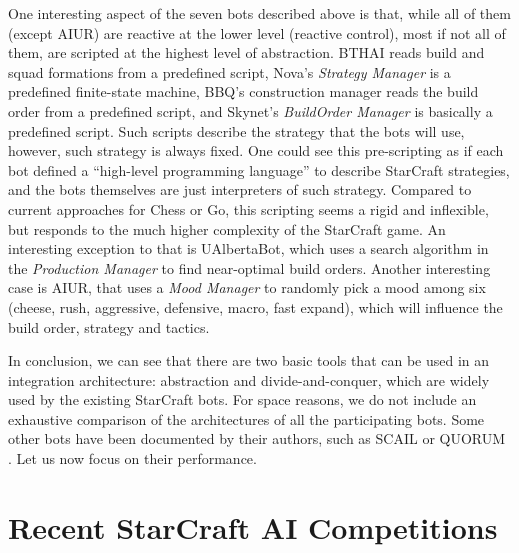\documentclass[journal]{IEEEtran}
\begin{document}
One  interesting aspect  of the  seven bots  described above  is that,
while all  of them (except AIUR) are  reactive at the  lower level
(reactive  control), most  if not  all of  them, are  scripted  at the
highest level  of abstraction. BTHAI reads build  and squad formations
from  a  predefined  script,   Nova's  {\em  Strategy  Manager}  is  a
predefined finite-state machine,  BBQ's construction manager reads the
build  order from a  predefined script,  and Skynet's  {\em BuildOrder
  Manager} is basically a predefined script. Such scripts describe the
strategy  that the  bots will  use, however,  such strategy  is always
fixed.   One could see  this pre-scripting  as if  each bot  defined a
``high-level programming language''  to describe StarCraft strategies,
and   the   bots   themselves    are   just   interpreters   of   such
strategy.  Compared  to  current  approaches  for Chess  or  Go,  this
scripting  seems a  rigid and  inflexible,  but responds  to the  much
higher complexity of the  StarCraft game.  An interesting exception to
that  is  UAlbertaBot, which  uses  a  search  algorithm in  the  {\em
  Production  Manager}  to find  near-optimal  build orders.   Another
interesting case is  AIUR, that uses a {\em  Mood Manager} to randomly
pick  a mood among  six (cheese,  rush, aggressive,  defensive, macro,
fast  expand), which  will  influence the  build  order, strategy  and
tactics. %

In conclusion, we can see that there are two basic tools that can be used in an integration architecture: abstraction and divide-and-conquer, which are widely used by the existing StarCraft bots. For space reasons, we do not include an exhaustive comparison of the architectures of all the participating bots. Some other bots have been documented by their authors, such as SCAIL \cite{YoungSCAIL} or QUORUM \cite{young2012evolutionary}.
Let us now focus on their performance.



\section{Recent StarCraft AI Competitions}\label{sec:competition}
\end{document}
